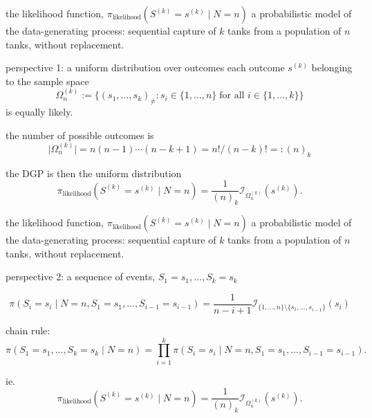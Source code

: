 \documentclass[10pt]{beamer}
\begin{document}
\begin{frame}[t]{the likelihood function, $\pi_{\text{likelihood}}(S^{(k)}=s^{(k)} \mid N=n)$}
\alert{a probabilistic model of the data-generating process}: sequential capture of $k$ tanks from a population of $n$ tanks, without replacement.

\pause 

\begin{exampleblock}{perspective 1: a uniform distribution over outcomes}
each outcome $s^{(k)}$ belonging to the sample space
\begin{equation*}
	\Omega_n^{(k)} := \{ (s_1, ..., s_k)_{\neq}  :  s_i \in \{1, ..., n\} \; \text{for all } i \in \{ 1,..., k \} \}
\end{equation*} 
is equally likely.

\pause the number of possible outcomes is
\begin{equation*}
	\lvert \Omega_n^{(k)} \rvert= n(n-1)\cdots (n-k+1) = n! / (n-k)! =:(n)_k
\end{equation*}

\pause the DGP is then the uniform distribution
\begin{equation*}
	\pi_{\text{likelihood}}(S^{(k)}=s^{(k)} \mid N=n)=
	\dfrac{1}{(n)_k} \mathcal{I}_{\Omega_n^{(k)}}\left(s^{(k)}\right).
\end{equation*}
\end{exampleblock}
\end{frame}


\begin{frame}[t]{the likelihood function, $\pi_{\text{likelihood}}(S^{(k)}=s^{(k)} \mid N=n)$}
\alert{a probabilistic model of the data-generating process}: sequential capture of $k$ tanks from a population of $n$ tanks, without replacement.


\begin{exampleblock}{perspective 2: a sequence of events, $S_1=s_1, ..., S_k=s_k$}
\pause 

	\begin{equation*}
		\pi (S_i=s_i \mid N=n, S_1=s_1, ..., S_{i-1}=s_{i-1})=\dfrac{1}{n-i+1} \mathcal{I}_{ \{1,...,n\} \setminus \{s_1, ..., s_{i-1}\}}(s_i)
	\end{equation*}

\pause chain rule:
\begin{equation*}
	\pi(S_1=s_1, ..., S_k=s_k \mid N=n) = \displaystyle \prod_{i=1}^k \pi (S_i=s_i \mid N=n, S_1=s_1,...,S_{i-1}=s_{i-1}).
\end{equation*}

\pause ie.
\begin{equation*}
	\pi_{\text{likelihood}}(S^{(k)}=s^{(k)} \mid N=n)=
	\dfrac{1}{(n)_k} \mathcal{I}_{\Omega_n^{(k)}}\left(s^{(k)}\right).
\end{equation*}

\end{exampleblock}
\end{frame}
\end{document}
